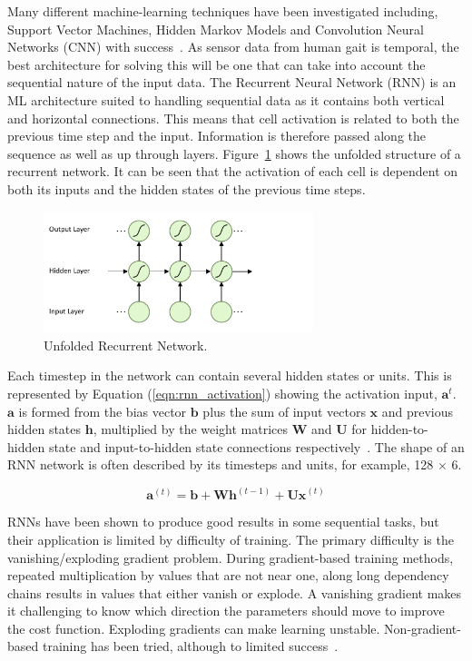 Many different machine-learning techniques have been investigated including, Support Vector Machines, Hidden Markov Models and Convolution Neural Networks (CNN) with success~\cite{Labarriere2020}. As sensor data from human gait is temporal, the best architecture for solving this will be one that can take into account the sequential nature of the input data. The Recurrent Neural Network (RNN) is an ML architecture suited to handling sequential data as it contains both vertical and horizontal connections. This means that cell activation is related to both the previous time step and the input. Information is therefore passed along the sequence as well as up through layers. Figure~\ref{fig:rnn_structure} shows the unfolded structure of a recurrent network. It can be seen that the activation of each cell is dependent on both its inputs and the hidden states of the previous time steps.

\begin{figure}[!hbt]
    \centering
    \includegraphics[width=0.7\textwidth]{content/4-LSTM_Behaviour/lstm/rnn_structure.pdf}
    \caption{Unfolded Recurrent Network.}
    \label{fig:rnn_structure}
\end{figure}

Each timestep in the network can contain several hidden states or units. This is represented by Equation (\ref{eqn:rnn_activation}) showing the activation input, $\mathbf{a}^t$. $\mathbf{a}$ is formed from the bias vector $\mathbf{b}$ plus the sum of input vectors $\mathbf{x}$ and previous hidden states $\mathbf{h}$, multiplied by the weight matrices $\mathbf{W}$ and $\mathbf{U}$ for hidden-to-hidden state and input-to-hidden state connections respectively~\cite{Goodfellow2015}. The shape of an RNN network is often described by its timesteps and units, for example, 128 $\times$ 6.

\begin{equation}
    \mathbf{a}^{(t)} = \mathbf{b} + \mathbf{Wh}^{(t-1)} + \mathbf{Ux}^{(t)}
    \label{eqn:rnn_activation}
\end{equation}

RNNs have been shown to produce good results in some sequential tasks, but their application is limited by difficulty of training. The primary difficulty is the vanishing/exploding gradient problem. During gradient-based training methods, repeated multiplication by values that are not near one, along long dependency chains results in values that either vanish or explode. A vanishing gradient makes it challenging to know which direction the parameters should move to improve the cost function. Exploding gradients can make learning unstable. Non-gradient-based training has been tried, although to limited success~\cite{Graves2012, Goodfellow2015}.

